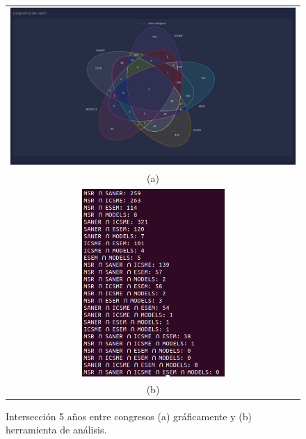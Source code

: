 \documentclass[a4paper, 12pt]{book}
\begin{document}
\begin{figure}[!h]
    \centering
    \begin{tabular}{c}
    \includegraphics[width=1\textwidth]{img/inter_5_years_graph.png} \\
    (a) \\
    \includegraphics[width=0.5\textwidth]{img/inter_5_years.png} \\
    (b)
    \end{tabular}
    \caption{Intersección 5 años entre congresos (a) gráficamente y (b) herramienta de análisis.}
    \label{fig:comp_inter_5_year}
\end{figure}
\end{document}
